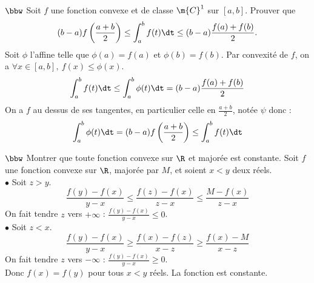 \documentclass[11pt]{article}
\begin{document}
\vspace*{0.5cm}

\begin{exercice}{$\bbw$}{}
    Soit $f$ une fonction convexe et de classe $\m{C}^1$ sur $[a,b]$. Prouver que
    \begin{equation*}
        (b-a)f\left( \frac{a+b}{2} \right)\leq \int_a^bf(t)\dt\leq(b-a)\frac{f(a)+f(b)}{2}.
    \end{equation*}
    \tcblower
    Soit $\phi$ l'affine telle que $\phi(a)=f(a)$ et $\phi(b)=f(b)$. Par convexité de $f$, on a $\forall x \in [a,b], ~ f(x) \leq \phi(x)$.
    \begin{equation*}
        \int_a^bf(t)\dt \leq \int_a^b\phi(t)\dt = (b-a)\frac{f(a)+f(b)}{2}
    \end{equation*}
    On a $f$ au dessus de ses tangentes, en particulier celle en $\frac{a+b}{2}$, notée $\psi$ donc :
    \begin{equation*}
        \int_a^b \phi(t)\dt = (b-a)f\left( \frac{a+b}{2} \right) \leq \int_a^b f(t)\dt
    \end{equation*}
\end{exercice}

\vspace*{0.5cm}

\begin{exercice}{$\bbw$}{}
    Montrer que toute fonction convexe sur $\R$ et majorée est constante.
    \tcblower
    Soit $f$ une fonction convexe sur $\R$, majorée par $M$, et soient $x<y$ deux réels.\\
    $\bullet$ Soit $z>y$.
    \begin{equation*}
        \frac{f(y)-f(x)}{y-x} \leq \frac{f(z)-f(x)}{z-x} \leq \frac{M-f(x)}{z-x}
    \end{equation*}
    On fait tendre $z$ vers $+\infty$ : $\frac{f(y)-f(x)}{y-x}\leq0$.\\
    $\bullet$ Soit $z<x$.
    \begin{equation*}
        \frac{f(y)-f(x)}{y-x} \geq \frac{f(x)-f(z)}{x-z} \geq \frac{f(x)-M}{x-z}
    \end{equation*}
    On fait tendre $z$ vers $-\infty$ : $\frac{f(y)-f(x)}{y-x}\geq0$.\\
    Donc $f(x)=f(y)$ pour tous $x<y$ réels. La fonction est constante.
\end{exercice}

\vspace*{0.5cm}
\end{document}
